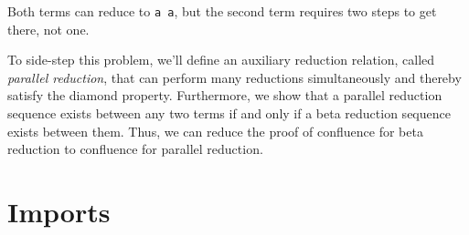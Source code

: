 Both terms can reduce to \texttt{a\ a}, but the second term requires two
steps to get there, not one.

To side-step this problem, we'll define an auxiliary reduction relation,
called \emph{parallel reduction}, that can perform many reductions
simultaneously and thereby satisfy the diamond property. Furthermore, we
show that a parallel reduction sequence exists between any two terms if
and only if a beta reduction sequence exists between them. Thus, we can
reduce the proof of confluence for beta reduction to confluence for
parallel reduction.

\hypertarget{imports}{%
\section{Imports}\label{imports}}

